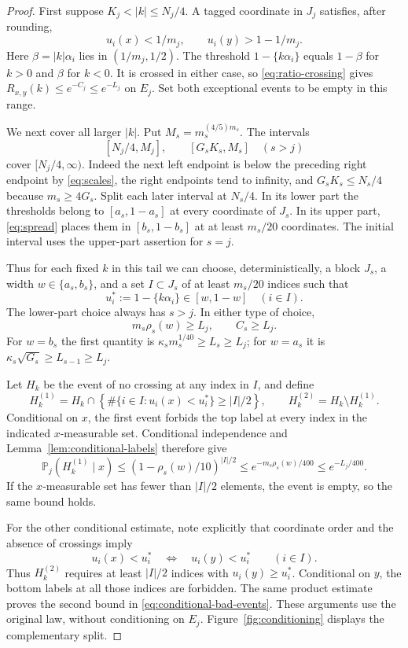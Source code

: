 \begin{proof}
First suppose $K_j<|k|\le N_j/4$. A tagged coordinate in $J_j$ satisfies,
after rounding,
\[
 u_i(x)<1/m_j,\qquad u_i(y)>1-1/m_j.
\]
Here $\beta=|k|\alpha_i$ lies in $(1/m_j,1/2)$. The threshold
$1-\{k\alpha_i\}$ equals $1-\beta$ for $k>0$ and $\beta$ for $k<0$.
It is crossed in either case, so \eqref{eq:ratio-crossing} gives
$R_{x,y}(k)\le e^{-C_j}\le e^{-L_j}$ on $E_j$. Set both exceptional
events to be empty in this range.

We next cover all larger $|k|$. Put $M_s=m_s^{(4/5)m_s}$. The intervals
\[
 [N_j/4,M_j],\qquad [G_sK_s,M_s]\quad(s>j)
\]
cover $[N_j/4,\infty)$. Indeed the next left endpoint is below the
preceding right endpoint by \eqref{eq:scales}, the right endpoints tend
to infinity, and $G_sK_s\le N_s/4$ because $m_s\ge4G_s$.
Split each later interval at $N_s/4$. In its lower part the thresholds
belong to $[a_s,1-a_s]$ at every coordinate of $J_s$. In its upper part,
\eqref{eq:spread} places them in $[b_s,1-b_s]$ at at least $m_s/20$
coordinates. The initial interval uses the upper-part assertion for
$s=j$.

Thus for each fixed $k$ in this tail we can choose, deterministically,
a block $J_s$, a width $w\in\{a_s,b_s\}$, and a set $I\subset J_s$
of at least $m_s/20$ indices such that
\[
 u_i^*:=1-\{k\alpha_i\}\in[w,1-w]\quad(i\in I).
\]
The lower-part choice always has $s>j$. In either type of choice,
\begin{equation}\label{eq:crossing-intensity}
 m_s\rho_s(w)\ge L_j,
 \qquad C_s\ge L_j.
\end{equation}
For $w=b_s$ the first quantity is
$\kappa_sm_s^{1/40}\ge L_s\ge L_j$; for $w=a_s$ it is
$\kappa_s\sqrt{G_s}\ge L_{s-1}\ge L_j$.

Let $H_k$ be the event of no crossing at any index in $I$, and define
\[
 H_k^{(1)}=H_k\cap
    \left\{\#\{i\in I:u_i(x)<u_i^*\}\ge|I|/2\right\},
 \qquad H_k^{(2)}=H_k\setminus H_k^{(1)}.
\]
Conditional on $x$, the first event forbids the top label at every
index in the indicated $x$-measurable set. Conditional independence
and Lemma~\ref{lem:conditional-labels} therefore give
\[
 \mathbb P_j(H_k^{(1)}\mid x)
 \le(1-\rho_s(w)/10)^{|I|/2}
 \le e^{-m_s\rho_s(w)/400}\le e^{-L_j/400}.
\]
If the $x$-measurable set has fewer than $|I|/2$ elements, the event is
empty, so the same bound holds.

For the other conditional estimate, note explicitly that coordinate
order and the absence of crossings imply
\[
 u_i(x)<u_i^*\quad\Longleftrightarrow\quad u_i(y)<u_i^*
 \qquad(i\in I).
\]
Thus $H_k^{(2)}$ requires at least $|I|/2$ indices with
$u_i(y)\ge u_i^*$. Conditional on $y$, the bottom labels at all those
indices are forbidden. The same product estimate proves the second
bound in \eqref{eq:conditional-bad-events}. These arguments use the
original law, without conditioning on $E_j$.
Figure~\ref{fig:conditioning} displays the complementary split.



\end{proof}
